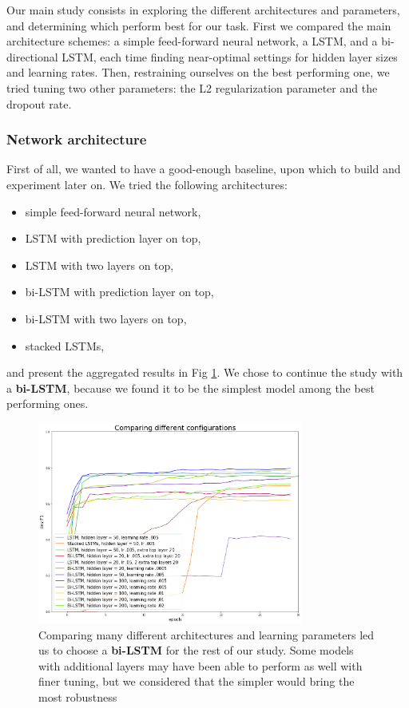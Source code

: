 \documentclass{article} %
\begin{document}
Our main study consists in exploring the different architectures and parameters, and determining which perform best for our task. First we compared the main architecture schemes: a simple feed-forward neural network, a LSTM, and a bi-directional LSTM, each time finding near-optimal settings for hidden layer sizes and learning rates. Then, restraining ourselves on the best performing one, we tried tuning two other parameters: the L2 regularization parameter and the dropout rate.

\subsubsection{Network architecture}

First of all, we wanted to have a good-enough baseline, upon which to build and experiment later on. We tried the following architectures:
\begin{itemize}
\item simple feed-forward neural network,
\item LSTM with prediction layer on top,
\item LSTM with two layers on top,
\item bi-LSTM with prediction layer on top,
\item bi-LSTM with two layers on top,
\item stacked LSTMs,
\end{itemize}

and present the aggregated results in Fig \ref{config_compar}. We chose to continue the study with a \textbf{bi-LSTM}, because we found it to be the simplest model among the best performing ones.

\begin{figure}[h]
\begin{center}
\includegraphics[width=330px]{figs/config_compar.png}
\caption{Comparing many different architectures and learning parameters led us to choose a \textbf{bi-LSTM} for the rest of our study. Some models with additional layers may have been able to perform as well with finer tuning, but we considered that the simpler would bring the most robustness}
\label{config_compar}
\end{center}
\end{figure}
\end{document}
